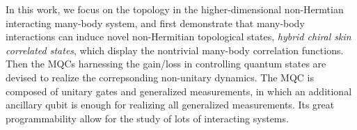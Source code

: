 \documentclass[longbibliography, aps, prx, amsmath, amssymb, amsfonts, twocolumn,superscriptaddress, footinbib]{revtex4-1}
\begin{document}
	In this work, 
	we focus on the topology in the higher-dimensional non-Hermtian interacting many-body system, and first demonstrate that many-body interactions can induce novel non-Hermitian topological states, \textit{hybrid chiral skin correlated states}, which display the nontrivial many-body correlation functions. Then the MQCs harnessing the gain/loss in controlling quantum states are devised to realize the correpsonding non-unitary dynamics. The MQC is composed of unitary gates and generalized measurements, in which an additional ancillary qubit is enough for realizing all generalized measurements. Its great programmability allow for the study of lots of interacting systems. 
	
\end{document}
